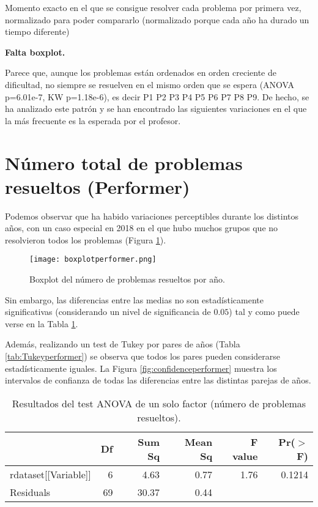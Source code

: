 Momento exacto en el que se consigue resolver cada problema por primera vez, normalizado para poder compararlo (normalizado porque cada año ha durado  un tiempo diferente)

\textbf{Falta boxplot.}

Parece que, aunque los problemas están ordenados en orden creciente de dificultad, no siempre se resuelven en el mismo orden que se espera (ANOVA p=6.01e-7, KW p=1.18e-6), es decir P1 P2 P3 P4 P5 P6 P7 P8 P9. De hecho, se ha analizado este patrón y se han encontrado las siguientes variaciones en el que la más frecuente es la esperada por el profesor.

\section{Número total de problemas resueltos (Performer)}

Podemos observar que ha habido variaciones perceptibles durante los distintos años, con un caso especial en 2018 en el que hubo muchos grupos que no resolvieron todos los problemas (Figura \ref{fig:boxplotperformer}).

\begin{figure}[H]
    \centering
    \texttt{[image: boxplotperformer.png]}
    \caption{Boxplot del número de problemas resueltos por año.}
    \label{fig:boxplotperformer}
\end{figure}

Sin embargo, las diferencias entre las medias no son estadísticamente significativas (considerando un nivel de significancia de $0.05$) tal y como puede verse en la Tabla \ref{tab:ANOVAperformer}.

Además, realizando un test de Tukey por pares de años (Tabla \ref{tab:Tukeyperformer}) se observa que todos los pares pueden considerarse estadísticamente iguales. La Figura \ref{fig:confidenceperformer} muestra los intervalos de confianza de todas las diferencias entre las distintas parejas de años.

\begin{table}[H]
\centering
\caption{Resultados del test ANOVA de un solo factor (número de problemas resueltos).}
\label{tab:ANOVAperformer}
\begin{tabular}{lrrrrr}
  \hline
 & Df & Sum Sq & Mean Sq & F value & Pr($>$F) \\ 
  \hline
rdataset[[Variable]] & 6 & 4.63 & 0.77 & 1.76 & 0.1214 \\ 
  Residuals            & 69 & 30.37 & 0.44 &  &  \\ 
   \hline
\end{tabular}
\end{table}

